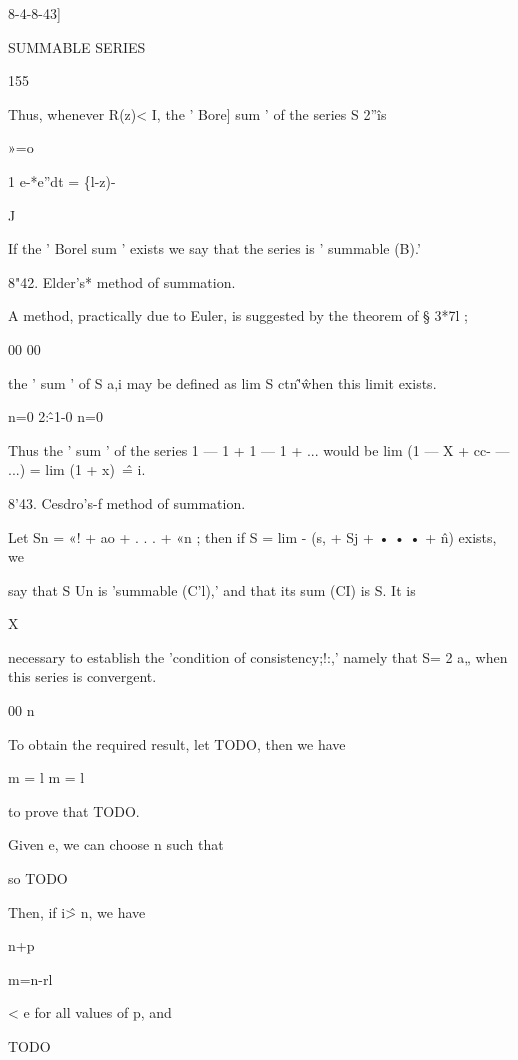 8-4-8-43] 



SUMMABLE SERIES 



155 



Thus, whenever R(z)< I, the ' Bore] sum ' of the series S 2''\^ is 

»=o 

1 e-*e''dt = \{l-z)-\ 

J 

If the ' Borel sum ' exists we say that the series is ' summable (B).' 

8"42. Elder's* method of summation. 

A method, practically due to Euler, is suggested by the theorem of § 3*7l ; 

00 00 

the ' sum ' of S a,i may be defined as lim S ctn\^'\^ when this limit exists. 

n=0 2:\^-1-0 n=0 

Thus the ' sum ' of the series 1 — 1 + 1 — 1 + ... would be 
lim (1 — X + cc- — ...) = lim (1 + x)~\^ = i. 

8'43. Cesdro's-f method of summation. 

Let Sn = «! + ao + . . . + «n ; then if S = lim - (s, + Sj + • • • + \^n) exists, we 

say that S Un is 'summable (C'l),' and that its sum (CI) is S. It is 

X 

necessary to establish the 'condition of consistency;!:,' namely that S= 2 a„ 
when this series is convergent. 

00 n 

To obtain the required result, let TODO, then we have 

m = l m = l 

to prove that TODO. 



Given e, we can choose n such that 

so TODO

Then, if i\^ > n, we have 



n+p 


m=n-rl 



< e for all values of p, and 



TODO


